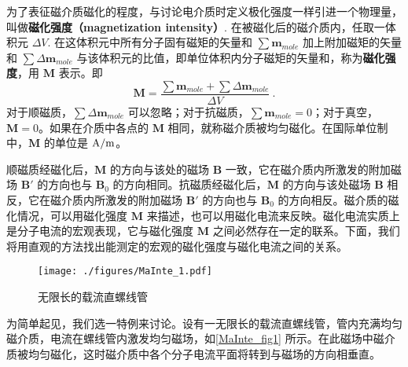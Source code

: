 
为了表征磁介质磁化的程度，与讨论电介质时定义极化强度一样引进一个物理量，叫做\textbf{磁化强度（magnetization intensity）}. 在被磁化后的磁介质内，任取一体积元 $\Delta V$. 在这体积元中所有分子固有磁矩的矢量和 $\sum \mathbf{m}_{mole}$ 加上附加磁矩的矢量和 $\sum \Delta\mathbf{m}_{mole}$ 与该体积元的比值，即单位体积内分子磁矩的矢量和，称为\textbf{磁化强度}，用 $\mathbf M$ 表示。即
\begin{equation}\label{MaInte_eq2}
\mathbf M=\frac{\sum \mathbf m_{mole}+\sum \Delta \mathbf m_{mole}}{\Delta V}~.
\end{equation}
对于顺磁质，$\sum \Delta\mathbf{m}_{mole}$ 可以忽略；对于抗磁质，$\sum \mathbf{m}_{mole}=0$；对于真空，$\mathbf M=0$。如果在介质中各点的 $\mathbf M $ 相同，就称磁介质被均匀磁化。在国际单位制中，$\mathbf M$ 的单位是 $\rm A/m$。

顺磁质经磁化后，$\mathbf M $ 的方向与该处的磁场 $\mathbf B $ 一致，它在磁介质内所激发的附加磁场 $\mathbf B' $ 的方向也与 $\mathbf B_0$ 的方向相同。抗磁质经磁化后，$\mathbf M $ 的方向与该处磁场 $\mathbf B $ 相反，它在磁介质内所激发的附加磁场 $\mathbf B' $ 的方向也与 $\mathbf B_0 $ 的方向相反。磁介质的磁化情况，可以用磁化强度 $\mathbf M $ 来描述，也可以用磁化电流来反映。磁化电流实质上是分子电流的宏观表现，它与磁化强度 $\mathbf M $ 之间必然存在一定的联系。下面，我们将用直观的方法找出能测定的宏观的磁化强度与磁化电流之间的关系。
\begin{figure}[ht]
\centering
\texttt{[image: ./figures/MaInte\_1.pdf]}
\caption{无限长的载流直螺线管} \label{MaInte_fig1}
\end{figure}
为简单起见，我们选一特例来讨论。设有一无限长的载流直螺线管，管内充满均匀磁介质，电流在螺线管内激发均匀磁场，如\autoref{MaInte_fig1} 所示。在此磁场中磁介质被均匀磁化，这时磁介质中各个分子电流平面将转到与磁场的方向相垂直。

